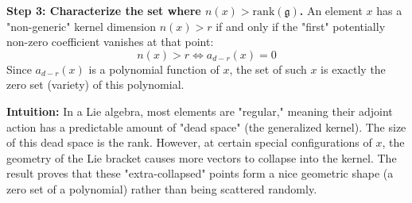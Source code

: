 \begin{solution}
\textbf{Step 3: Characterize the set where $n(x) > \text{rank}(\mathfrak{g})$.}
An element $x$ has a "non-generic" kernel dimension $n(x) > r$ if and only if the "first" potentially non-zero coefficient vanishes at that point:
\[ n(x) > r \iff a_{d-r}(x) = 0 \]
Since $a_{d-r}(x)$ is a polynomial function of $x$, the set of such $x$ is exactly the zero set (variety) of this polynomial.

\textbf{Intuition:}
In a Lie algebra, most elements are "regular," meaning their adjoint action has a predictable amount of "dead space" (the generalized kernel). The size of this dead space is the rank. However, at certain special configurations of $x$, the geometry of the Lie bracket causes more vectors to collapse into the kernel. The result proves that these "extra-collapsed" points form a nice geometric shape (a zero set of a polynomial) rather than being scattered randomly.
\end{solution}

